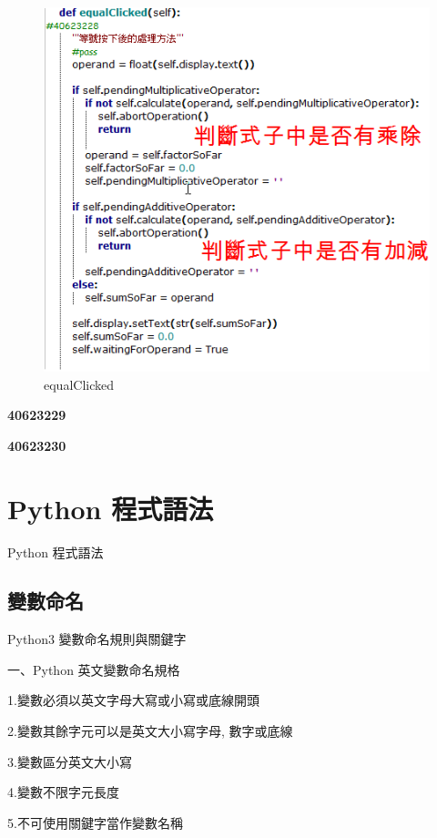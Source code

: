 \documentclass[12pt,,]{report}
\begin{document}
\begin{figure}
\centering
\includegraphics{./tex2pdf.17748/5c28660f5df2d159260b5d1a9005b0a6d83b3226.png}
\caption{equalClicked\label{fig:equalClicked}}
\end{figure}

\textbf{40623229}

\textbf{40623230}

\hypertarget{python-ux7a0bux5f0fux8a9eux6cd5}{%
\chapter{Python 程式語法}\label{python-ux7a0bux5f0fux8a9eux6cd5}}

Python 程式語法

\hypertarget{ux8b8aux6578ux547dux540d}{%
\section{變數命名}\label{ux8b8aux6578ux547dux540d}}

Python3 變數命名規則與關鍵字

一、Python 英文變數命名規格

1.變數必須以英文字母大寫或小寫或底線開頭

2.變數其餘字元可以是英文大小寫字母, 數字或底線

3.變數區分英文大小寫

4.變數不限字元長度

5.不可使用關鍵字當作變數名稱
\end{document}
